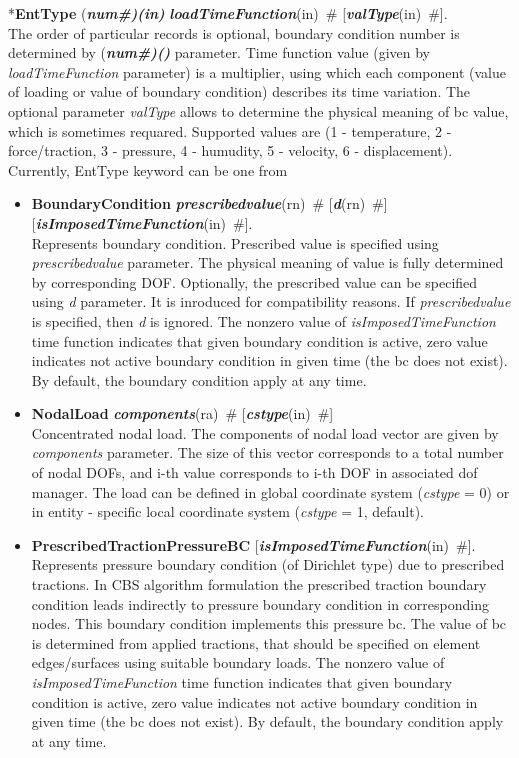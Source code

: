\documentclass[draft]{article}
\newcommand{\param}[1]{{\em #1}}
\newcommand{\fieldVal}[2]{\mbox{({\it\bf{#1}\#)\tiny (#2)}}}
\newcommand{\keywordnotype}[1]{\mbox{{\it{\bf{#1}}}}}
\newcommand{\keyword}[2]{\mbox{{\keywordnotype{#1}\tiny (#2)}}}
\newcommand{\entKeyword}[1]{\mbox{{*{\bf{#1}}}}}
\newcommand{\entKeywordInst}[1]{\mbox{{\bf{{#1}}}}}
\newcommand{\field}[2]{\mbox{\keyword{#1}{#2}~\#}}
\newcommand{\optField}[2]{\mbox{[\field{#1}{#2}]}}
\begin{document}
\entKeyword{EntType} \fieldVal{num}{in}
\field{loadTimeFunction}{in} \optField{valType}{in}.\\

The order of particular  records is optional, boundary condition number is determined by \fieldVal{num}{} parameter.
Time function value (given by \param{loadTimeFunction} parameter) is a multiplier, using which
each  component (value of loading or value of boundary condition)
describes its time variation. 
The optional parameter \param{valType} allows to determine the
physical meaning of bc value, which is sometimes requared. Supported
values are (1 - temperature, 2 - force/traction,
3 - pressure, 4 - humudity, 5 - velocity, 6 - displacement). 
Currently, EntType keyword can be one from
\begin{itemize}
\item \entKeywordInst{BoundaryCondition}
\field{prescribedvalue}{rn} \optField{d}{rn} 
\optField{is\-Impo\-sed\-Ti\-me\-Fun\-ction}{in}.\\
Represents boundary condition. 
Prescribed value is specified using \param{prescribedvalue} parameter. The
physical meaning of value is fully determined by corresponding DOF.
Optionally, the prescribed value can be specified using \param{d}
parameter. It is inroduced for compatibility reasons. If
\param{prescribedvalue} is specified, then \param{d} is ignored.
The nonzero value of \param{isImposedTimeFunction} time function
indicates that given boundary condition is active, zero value
indicates not active boundary condition in given time (the bc does not
exist). By default, the boundary condition apply at any time.
\item \entKeywordInst{NodalLoad}
\field{components}{ra} \optField{cstype}{in}\\
Concentrated nodal load. The components of nodal load vector 
are given by \param{components} parameter. The size of this vector
corresponds to a total number of nodal DOFs, and i-th value
corresponds to i-th DOF in associated dof manager. The load can be defined in global coordinate system (\param{cstype} =
0) or in entity - specific local coordinate system
(\param{cstype} = 1, default).
\item \entKeywordInst{PrescribedTractionPressureBC} \optField{is\-Impo\-sed\-Ti\-me\-Fun\-ction}{in}.\\
Represents pressure boundary condition (of Dirichlet type) due to
prescribed tractions. 
In CBS algorithm formulation the prescribed traction
boundary condition leads indirectly to pressure boundary condition in
corresponding nodes. This boundary condition implements this pressure
bc. The value of bc is determined from applied tractions, that  should be specified on element edges/surfaces using 
suitable boundary loads.
The nonzero value of \param{isImposedTimeFunction} time function
indicates that given boundary condition is active, zero value
indicates not active boundary condition in given time (the bc does not
exist). By default, the boundary condition apply at any time.
\end{itemize}
\end{document}

